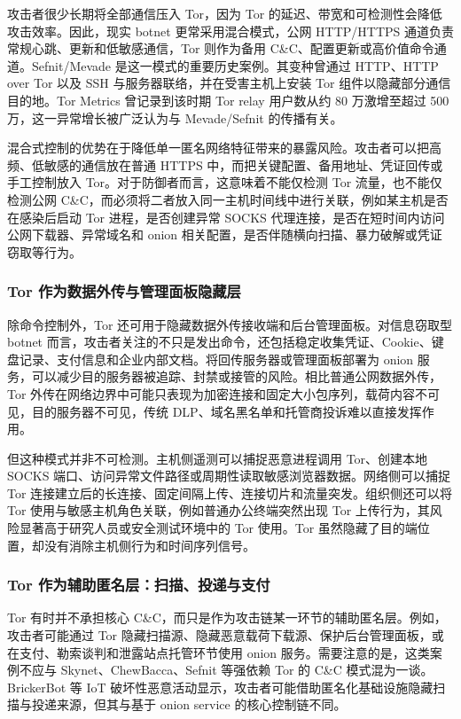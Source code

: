 攻击者很少长期将全部通信压入 Tor，因为 Tor 的延迟、带宽和可检测性会降低攻击效率。因此，现实 botnet 更常采用混合模式，公网 HTTP/HTTPS 通道负责常规心跳、更新和低敏感通信，Tor 则作为备用 C\&C、配置更新或高价值命令通道。Sefnit/Mevade 是这一模式的重要历史案例。其变种曾通过 HTTP、HTTP over Tor 以及 SSH 与服务器联络，并在受害主机上安装 Tor 组件以隐藏部分通信目的地。Tor Metrics 曾记录到该时期 Tor relay 用户数从约 80 万激增至超过 500 万，这一异常增长被广泛认为与 Mevade/Sefnit 的传播有关\cite{torproject2013mevade}。

混合式控制的优势在于降低单一匿名网络特征带来的暴露风险。攻击者可以把高频、低敏感的通信放在普通 HTTPS 中，而把关键配置、备用地址、凭证回传或手工控制放入 Tor。对于防御者而言，这意味着不能仅检测 Tor 流量，也不能仅检测公网 C\&C，而必须将二者放入同一主机时间线中进行关联，例如某主机是否在感染后启动 Tor 进程，是否创建异常 SOCKS 代理连接，是否在短时间内访问公网下载器、异常域名和 onion 相关配置，是否伴随横向扫描、暴力破解或凭证窃取等行为。

\subsubsection{Tor 作为数据外传与管理面板隐藏层}

除命令控制外，Tor 还可用于隐藏数据外传接收端和后台管理面板。对信息窃取型 botnet 而言，攻击者关注的不只是发出命令，还包括稳定收集凭证、Cookie、键盘记录、支付信息和企业内部文档。将回传服务器或管理面板部署为 onion 服务，可以减少目的服务器被追踪、封禁或接管的风险。相比普通公网数据外传，Tor 外传在网络边界中可能只表现为加密连接和固定大小包序列，载荷内容不可见，目的服务器不可见，传统 DLP、域名黑名单和托管商投诉难以直接发挥作用。

但这种模式并非不可检测。主机侧遥测可以捕捉恶意进程调用 Tor、创建本地 SOCKS 端口、访问异常文件路径或周期性读取敏感浏览器数据。网络侧可以捕捉 Tor 连接建立后的长连接、固定间隔上传、连接切片和流量突发。组织侧还可以将 Tor 使用与敏感主机角色关联，例如普通办公终端突然出现 Tor 上传行为，其风险显著高于研究人员或安全测试环境中的 Tor 使用。Tor 虽然隐藏了目的端位置，却没有消除主机侧行为和时间序列信号。

\subsubsection{Tor 作为辅助匿名层：扫描、投递与支付}

Tor 有时并不承担核心 C\&C，而只是作为攻击链某一环节的辅助匿名层。例如，攻击者可能通过 Tor 隐藏扫描源、隐藏恶意载荷下载源、保护后台管理面板，或在支付、勒索谈判和泄露站点托管环节使用 onion 服务。需要注意的是，这类案例不应与 Skynet、ChewBacca、Sefnit 等强依赖 Tor 的 C\&C 模式混为一谈。BrickerBot 等 IoT 破坏性恶意活动显示，攻击者可能借助匿名化基础设施隐藏扫描与投递来源，但其与基于 onion service 的核心控制链不同\cite{fortinet2017brickerbot}。

